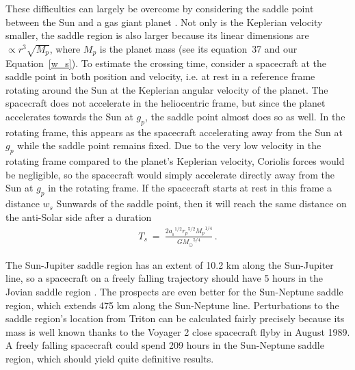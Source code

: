 \documentclass[fleqn,usenatbib,useAMS]{mnras} %
\begin{document}
These difficulties can largely be overcome by considering the saddle point between the Sun and a gas giant planet \citep{Penner_2020}. Not only is the Keplerian velocity smaller, the saddle region is also larger because its linear dimensions are $\propto r^3 \sqrt{M_p}$, where $M_p$ is the planet mass (see its equation~37 and our Equation~\ref{w_s}). To estimate the crossing time, consider a spacecraft at the saddle point in both position and velocity, i.e. at rest in a reference frame rotating around the Sun at the Keplerian angular velocity of the planet. The spacecraft does not accelerate in the heliocentric frame, but since the planet accelerates towards the Sun at $g_p$, the saddle point almost does so as well. In the rotating frame, this appears as the spacecraft accelerating away from the Sun at $g_p$ while the saddle point remains fixed. Due to the very low velocity in the rotating frame compared to the planet's Keplerian velocity, Coriolis forces would be negligible, so the spacecraft would simply accelerate directly away from the Sun at $g_p$ in the rotating frame. If the spacecraft starts at rest in this frame a distance $w_s$ Sunwards of the saddle point, then it will reach the same distance on the anti-Solar side after a duration
\begin{eqnarray}
    T_s ~=~ \frac{2 {a_{_0}}^{1/2} {r_p}^{5/2} {M_p}^{1/4}}{G{M_\odot}^{5/4}} \, .
    \label{t_s}
\end{eqnarray}

The Sun-Jupiter saddle region has an extent of 10.2 km along the Sun-Jupiter line, so a spacecraft on a freely falling trajectory should have 5 hours in the Jovian saddle region \citep{Penner_2020}. The prospects are even better for the Sun-Neptune saddle region, which extends 475 km along the Sun-Neptune line. Perturbations to the saddle region's location from Triton can be calculated fairly precisely because its mass is well known thanks to the Voyager 2 close spacecraft flyby in August 1989. A freely falling spacecraft could spend 209 hours in the Sun-Neptune saddle region, which should yield quite definitive results.
\end{document}
